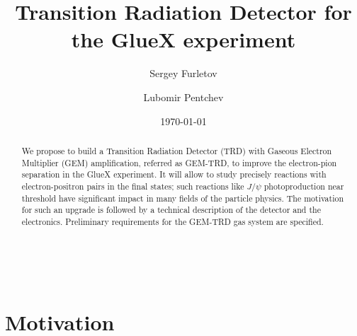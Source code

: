 \documentclass[%
preprint,
nofootinbib,
 amsmath,amssymb,
 aps,
floatfix,
]{revtex4-1}
\begin{document}

\title{ 
Transition Radiation Detector for the GlueX experiment
}%
\author{Sergey Furletov}
\author{Lubomir Pentchev}
%



\date{\today}%

\begin{abstract}
We propose to build a Transition Radiation Detector (TRD) 
with Gaseous Electron Multiplier (GEM) amplification, referred as GEM-TRD,
to improve the electron-pion separation in the GlueX experiment.
It will allow to study precisely reactions with 
electron-positron pairs in the final states; such reactions like
$J/\psi $ photoproduction near threshold have significant impact
in many fields of the particle physics.
The motivation for such an upgrade is followed by a 
technical description of the detector and the electronics. 
Preliminary requirements for the GEM-TRD gas system are specified. 
\end{abstract}

\maketitle


\clearpage
\mbox{~}

\section{Motivation}
\end{document}
